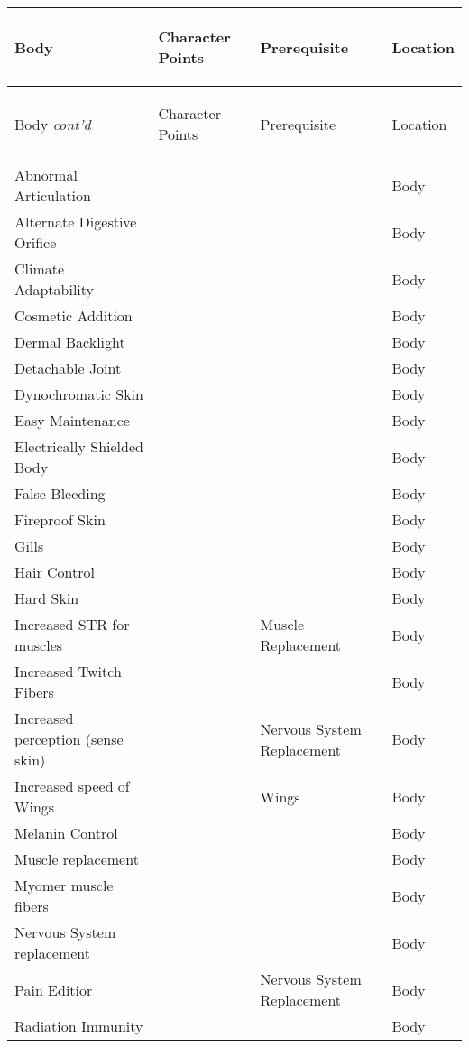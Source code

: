 \documentclass[twoside]{book}
\begin{document}
\begin{longtable}{p{1.25in}p{2em}ll} 
  Body& \begin{turn}{70}{Character Points}\end{turn}
          & \begin{turn}{70}{Prerequisite}\end{turn}
          & \begin{turn}{70}{Location}\end{turn}
          \\
  \hline
  \hline
  \endfirsthead
  Body \textit{cont'd}
        & \begin{turn}{70}{Character Points}\end{turn}
          & \begin{turn}{70}{Prerequisite}\end{turn}
          & \begin{turn}{70}{Location}\end{turn}
           \\
  \hline
  \endhead
\raggedright  Abnormal Articulation&&& Body\tabularnewline
      \raggedright  Alternate Digestive Orifice&&& Body\tabularnewline
      \raggedright  Climate Adaptability&&& Body\tabularnewline
      \raggedright  Cosmetic Addition&&& Body\tabularnewline
      \raggedright  Dermal Backlight&&& Body\tabularnewline
      \raggedright  Detachable Joint&&& Body\tabularnewline
      \raggedright  Dynochromatic Skin&&& Body\tabularnewline
      \raggedright  Easy Maintenance&&& Body\tabularnewline
      \raggedright  Electrically Shielded Body&&& Body\tabularnewline
      \raggedright  False Bleeding&&& Body\tabularnewline
      \raggedright  Fireproof Skin&&& Body\tabularnewline
      \raggedright  Gills&&& Body\tabularnewline
      \raggedright  Hair Control&&& Body\tabularnewline
      \raggedright  Hard Skin&&& Body\tabularnewline
      \raggedright  Increased STR for muscles&& Muscle Replacement& Body\tabularnewline
      \raggedright  Increased Twitch Fibers&&& Body\tabularnewline
      \raggedright  Increased perception (sense
           skin)&& Nervous System
           Replacement& Body\tabularnewline
      \raggedright  Increased speed of Wings&& Wings& Body\tabularnewline
      \raggedright  Melanin Control&&& Body\tabularnewline
      \raggedright  Muscle replacement&&& Body\tabularnewline
      \raggedright  Myomer muscle fibers&&& Body\tabularnewline
      \raggedright  Nervous System replacement&&& Body\tabularnewline
      \raggedright  Pain Editior&& Nervous System
           Replacement& Body\tabularnewline
      \raggedright  Radiation Immunity&&& Body\tabularnewline

\end{longtable}
\end{document}

